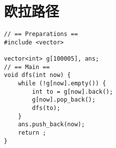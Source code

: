 \section{欧拉路径}

\begin{verbatim}
// == Preparations ==
#include <vector>

vector<int> g[100005], ans;
// == Main ==
void dfs(int now) {
    while (!g[now].empty()) {
        int to = g[now].back();
        g[now].pop_back();
        dfs(to);
    }
    ans.push_back(now);
    return ;
}
\end{verbatim}